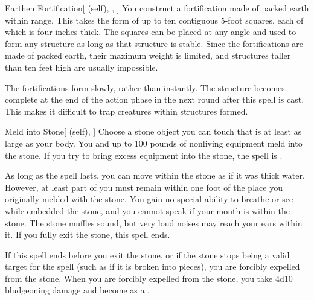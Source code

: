 \lowercase{\hypertarget{spell:Earthen Fortification}{}}\label{spell:Earthen Fortification}
\begin{attuneability}[\nth{2}]{\hypertarget{spell:Earthen Fortification}{Earthen Fortification}}[ (self), , ]
You construct a fortification made of packed earth within \rngmed range.
This takes the form of up to ten contiguous 5-foot squares, each of which is four inches thick.
The squares can be placed at any angle and used to form any structure as long as that structure is stable.
Since the fortifications are made of packed earth, their maximum weight is limited, and structures taller than ten feet high are usually impossible.

The fortifications form slowly, rather than instantly.
The structure becomes complete at the end of the action phase in the next round after this spell is cast.
This makes it difficult to trap creatures within structures formed.
\end{attuneability}
\vspace{0.25em}



\lowercase{\hypertarget{spell:Meld into Stone}{}}\label{spell:Meld into Stone}
\begin{attuneability}[\nth{2}]{\hypertarget{spell:Meld into Stone}{Meld into Stone}}[ (self), ]
Choose a stone object you can touch that is at least as large as your body.
You and up to 100 pounds of nonliving equipment meld into the stone.
If you try to bring excess equipment into the stone, the spell is .

As long as the spell lasts, you can move within the stone as if it was thick water.
However, at least part of you must remain within one foot of the place you originally melded with the stone.
You gain no special ability to breathe or see while embedded the stone, and you cannot speak if your mouth is within the stone.
The stone muffles sound, but very loud noises may reach your ears within it.
If you fully exit the stone, this spell ends.

If this spell ends before you exit the stone, or if the stone stops being a valid target for the spell (such as if it is broken into pieces), you are forcibly expelled from the stone.
When you are forcibly expelled from the stone, you take 4d10 bludgeoning damage and become  as a .
\end{attuneability}
\vspace{0.25em}



